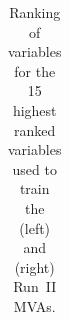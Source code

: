 \begin{table}[h]
{\begin{tabular}{ c l c | c l c}
\hline
\end{tabular}
}
\caption{Ranking of variables for the 15 highest ranked variables used to train the \decay{\Dsp}{\Kp\Km\pip} (left) and \decay{\phiz}{\Kp\Km} (right) Run~II MVAs.}
\label{tab:mvarank_dsandphi}
\end{table}


